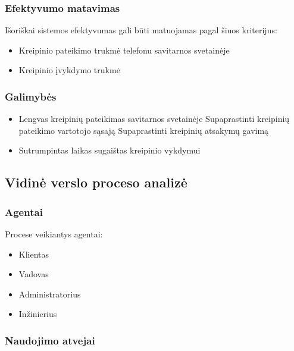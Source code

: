 		\subsubsection{Efektyvumo matavimas}
		
			Išoriškai sistemos efektyvumas gali būti matuojamas pagal šiuos kriterijus:
			\begin{itemize}
				\item Kreipinio pateikimo trukmė
					\subitem telefonu
					\subitem savitarnos svetainėje
				\item Kreipinio įvykdymo trukmė
			\end{itemize}

		\subsubsection{Galimybės}

			\begin{itemize}
				\item Lengvas kreipinių pateikimas savitarnos svetainėje
					\subitem Supaprastinti kreipinių pateikimo vartotojo sąsają
					\subitem Supaprastinti kreipinių atsakymų gavimą
				\item Sutrumpintas laikas sugaištas kreipinio vykdymui
			\end{itemize}

	\subsection{Vidinė verslo proceso analizė}

		\subsubsection{Agentai}
		
			Procese veikiantys agentai:
			\begin{itemize}
				\item Klientas
				\item Vadovas
				\item Administratorius
				\item Inžinierius
			\end{itemize}

		\subsubsection{Naudojimo atvejai}

